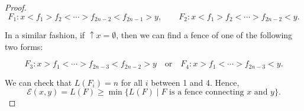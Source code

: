 \documentclass{article}[12pt]
\theoremstyle{exampstyle}
\newtheorem{definition}[theorem]{Definition}
\theoremstyle{remark}
\newtheorem*{remark}{Remark}
\newcommand{\N}{\mathbb{N}}
\newcommand{\E}{\mathcal{E}}
\renewcommand{\P}{\mathcal{P}}
\newcommand{\End}{\text{End}}
\begin{document}
\begin{proof}
    \[ F_1: x < f_1 > f_2 < \cdots > f_{2n-2} < f_{2n-1} > y, \quad \quad F_2:  x < f_1 > f_2 < \cdots > f_{2n-2} <  y. \]

    In a similar fashion, if $\uparrow x = \emptyset$, then we can find a fence of one of the following two forms:

    \[ F_3: x > f_1 <  \cdots > f_{2n-3} < f_{2n-2} > y \quad \text{or} \quad   F_4: x > f_1 <  \cdots > f_{2n-3} < y. \]

    We can check that $L(F_i) = n $ for all $i$ between 1 and 4.  Hence,
    \[
    \E(x,y)  =  L(F) \geq \min \{L(F) \mid F \text { is a fence connecting } x \text{ and } y\}. 
    \]
\end{proof}








\end{document}
